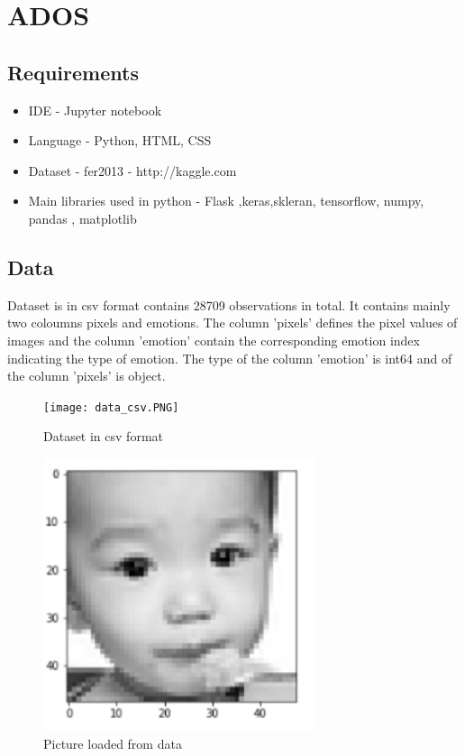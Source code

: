 \section{ADOS}
\subsection{Requirements}
\begin{itemize}
  \item IDE - Jupyter notebook
  \item Language - Python, HTML, CSS
  \item Dataset - fer2013   -  http://kaggle.com
  \item Main libraries used in python - Flask ,keras,skleran, tensorflow, numpy, pandas , matplotlib
\end{itemize}

\subsection{Data}

Dataset is in csv format contains 28709 observations in total. It contains mainly two coloumns pixels and emotions. The column 'pixels' defines the pixel values of images and the column 'emotion' contain the corresponding emotion index indicating the type of emotion. The type of the column 'emotion' is int64 and of the column 'pixels' is object.

\begin{figure}[h]
\label{ss}
\centering
\texttt{[image: data\_csv.PNG]}
\caption{Dataset in csv format}
\end{figure}

\begin{figure}[h]
\label{ss}
\centering
\includegraphics[width= 8cm]{data_pic.PNG}
\caption{Picture loaded from data}
\end{figure}

